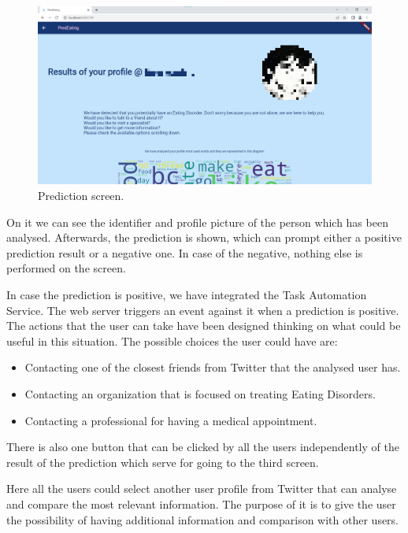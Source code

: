 \begin{figure}[!htp]
    \centering
    \includegraphics[scale=0.23]{img/case/predictionscreen.png}
    \caption{Prediction screen.}
    \label{fig:predictionscreen}
\end{figure}

On it we can see the identifier and profile picture of the person which has been analysed. Afterwards, the prediction is shown, which can prompt either a positive prediction result or a negative one. In case of the negative, nothing else is performed on the screen.

In case the prediction is positive, we have integrated the Task Automation Service. The web server triggers an event against it when a prediction is positive. The actions that the user can take have been designed thinking on what could be useful in this situation. The possible choices the user could have are:
\begin{itemize}
    \item Contacting one of the closest friends from Twitter that the analysed user has.
    \item Contacting an organization that is focused on treating Eating Disorders.
    \item Contacting a professional for having a medical appointment.
\end{itemize}

There is also one button that can be clicked by all the users independently of the result of the prediction which serve for going to the third screen.

Here all the users could select another user profile from Twitter that can analyse and compare the most relevant information. The purpose of it is to give the user the possibility of having additional information and comparison with other users.




